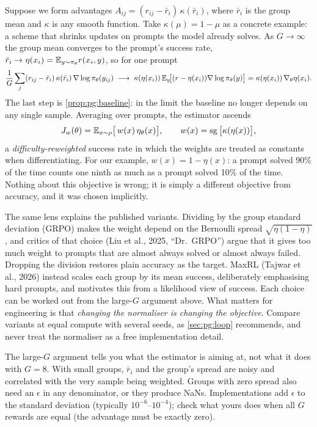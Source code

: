 Suppose we form advantages $A_{ij}=(r_{ij}-\bar r_i)\,\kappa(\bar r_i)$, where
$\bar r_i$ is the group mean and $\kappa$ is any smooth function. Take
$\kappa(\mu)=1-\mu$ as a concrete example: a scheme that shrinks updates on prompts the model
already solves. As $G\to\infty$ the group mean converges to the prompt's success rate,
$\bar r_i\to\eta(x_i)=\mathbb{E}_{y\sim\pi_\theta}r(x_i,y)$, so for one prompt
\begin{equation}
\frac1G\sum_j (r_{ij}-\bar r_i)\,\kappa(\bar r_i)\,\nabla\log\pi_\theta(y_{ij})
\;\longrightarrow\;\kappa(\eta(x_i))\,\mathbb{E}_y\!\big[(r-\eta(x_i))\nabla\log\pi_\theta(y)\big]
=\kappa(\eta(x_i))\,\nabla_\theta\eta(x_i).
\end{equation}
The last step is \cref{prop:pg:baseline}: in the limit the baseline no longer depends on any
single sample. Averaging over prompts, the estimator ascends
\begin{equation}
J_w(\theta)=\mathbb{E}_{x\sim\rho}\big[\,w(x)\,\eta_\theta(x)\big],\qquad
w(x)=\operatorname{sg}\big[\kappa(\eta(x))\big],
\end{equation}
a \emph{difficulty-reweighted} success rate in which the weights are treated as constants
when differentiating. For our example, $w(x)=1-\eta(x)$: a prompt solved 90\% of the time
counts one ninth as much as a prompt solved 10\% of the time. Nothing about this objective is
wrong; it is simply a different objective from accuracy, and it was chosen implicitly.

The same lens explains the published variants. Dividing by the group standard deviation
(GRPO) makes the weight depend on the Bernoulli spread $\sqrt{\eta(1-\eta)}$, and critics of
that choice (Liu et al., 2025, ``Dr.\ GRPO'') argue that it gives too much weight to prompts
that are almost always solved or almost always failed. Dropping the division restores plain
accuracy as the target. MaxRL (Tajwar et al., 2026) instead scales each group by its mean
success, deliberately emphasising hard prompts, and motivates this from a likelihood view of
success. Each choice can be worked out from the large-$G$ argument above. What matters for
engineering is that \emph{changing the normaliser is changing the objective}. Compare
variants at equal compute with several seeds, as \cref{sec:pg:loop} recommends, and never
treat the normaliser as a free implementation detail.

\begin{pitfall}
The large-$G$ argument tells you what the estimator is aiming at, not what it does with
$G=8$. With small groups, $\bar r_i$ and the group's spread are noisy and correlated with
the very sample being weighted. Groups with zero spread also need an $\epsilon$ in any
denominator, or they produce NaNs. Implementations add $\epsilon$ to the standard deviation
(typically $10^{-6}$--$10^{-4}$); check what yours does when all $G$ rewards are equal (the
advantage must be exactly zero).
\end{pitfall}

